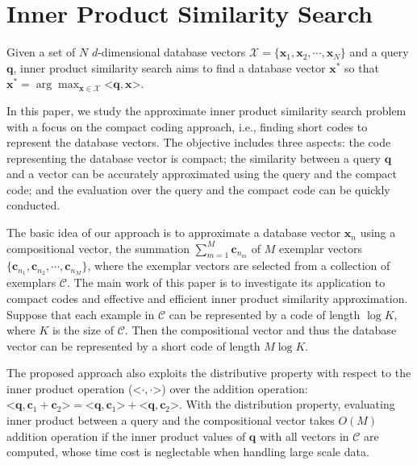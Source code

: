 \documentclass[10pt, letterpaper]{article}
\begin{document}
\section{Inner Product Similarity Search}\label{section:InnerProductSimilaritySearch}
Given a set of $N$ $d$-dimensional  database vectors
$\mathcal{X} = \{\mathbf{x}_1, \mathbf{x}_2, \cdots, \mathbf{x}_N\}$
and a query $\mathbf{q}$,
inner product similarity search aims to find a database vector
$\mathbf{x}^*$
so that $\mathbf{x}^* = \arg\max_{\mathbf{x} \in \mathcal{X}} \texttt{<} \mathbf{q}, \mathbf{x}\texttt{>}$.

In this paper,
we study the approximate inner product similarity search problem
with a focus on the compact coding approach,
i.e., finding short codes
to represent the database vectors.
The objective includes three aspects:
the code representing the database vector is compact;
the similarity between a query $\mathbf{q}$
and a vector
can be accurately approximated
using the query and the compact code;
and the evaluation over the query and the compact code
can be quickly conducted.

The basic idea of our approach is to approximate a database vector $\mathbf{x}_n$
using a compositional vector,
the summation $\sum_{m=1}^M \mathbf{c}_{n_m}$
of $M$ exemplar vectors
$\{\mathbf{c}_{n_1}, \mathbf{c}_{n_2}, \cdots, \mathbf{c}_{n_M}\}$,
where the exemplar vectors are selected
from a collection of exemplars
$\mathcal{C}$.
The main work of this paper is to investigate its application
to compact codes and effective and efficient inner product similarity approximation.
Suppose that each example in $\mathcal{C}$ can be
represented by a code of length $\log K$,
where $K$ is the size of $\mathcal{C}$.
Then the compositional vector
and thus the database vector
can be represented
by a short code of length $M\log K$.

The proposed approach
also
exploits the distributive property
with respect to the inner product operation ($\texttt{<}\cdot, \cdot\texttt{>}$)
over the addition operation:
$\texttt{<}\mathbf{q}, \mathbf{c}_1 + \mathbf{c}_2\texttt{>} = \texttt{<}\mathbf{q}, \mathbf{c}_1\texttt{>}
+ \texttt{<}\mathbf{q}, \mathbf{c}_2\texttt{>}$.
With the distribution property,
evaluating inner product
between a query and the compositional vector
takes $O(M)$ addition operation
if the inner product values of $\mathbf{q}$ with all vectors
in $\mathcal{C}$ are computed,
whose time cost is
neglectable when handling large scale data.
\end{document}
